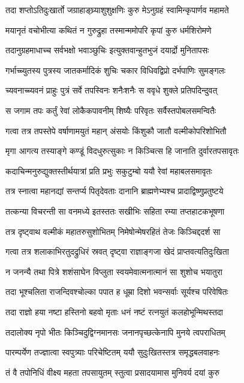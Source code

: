 \twolineshloka
{तदा शप्तोऽतिदुःखार्तो जग्राहाङ्घ्र्याशुशुक्षणिः}
{कुरु मेऽनुग्रहं स्वामिन्कृपार्णव महामते}%

\twolineshloka
{मयानृतं वचोभीत्या कथितं न गुरुद्रुहा}
{तस्मान्ममोपरि कृपां कुरु धर्मशिरोमणे}%

\twolineshloka
{तदानुग्रहमाधाच्च सर्वभक्षो भवाञ्छुचिः}
{इत्युक्तवान्हुतभुजं दयार्द्रो मुनितापसः}%

\twolineshloka
{गर्भाच्च्युतस्य पुत्रस्य जातकर्मादिकं शुचिः}
{चकार विधिवद्विप्रो दर्भपाणिः सुमङ्गलः}%

\twolineshloka
{च्यवनाच्च्यवनं प्राहुः पुत्रं सर्वे तपस्विनः}
{शनैःशनैः स ववृधे शुक्ले प्रतिपदिन्दुवत्}%

\twolineshloka
{स जगाम तपः कर्तुं रेवां लोकैकपावनीम्}
{शिष्यैः परिवृतः सर्वैस्तपोबलसमन्वितैः}%

\twolineshloka
{गत्वा तत्र तपस्तेपे वर्षाणामयुतं महान्}
{अंसयोः किंशुकौ जातौ वल्मीकोपरिशोभितौ}%

\twolineshloka
{मृगा आगत्य तस्याङ्गे कण्डूं विदधुरुत्सुकाः}
{न किञ्चित्स हि जानाति दुर्वारतपसावृतः}%

\twolineshloka
{कदाचिन्मनुरुद्युक्तस्तीर्थयात्रां प्रति प्रभुः}
{सकुटुम्बो ययौ रेवां महाबलसमावृतः}%

\twolineshloka
{तत्र स्नात्वा महानद्यां सन्तर्प्य पितृदेवताः}
{दानानि ब्राह्मणेभ्यश्च प्रादाद्विष्णुप्रतुष्टये}%

\twolineshloka
{तत्कन्या विचरन्ती सा वनमध्ये इतस्ततः}
{सखीभिः सहिता रम्या तप्तहाटकभूषणा}%

\twolineshloka
{तत्र दृष्ट्वाथ वल्मीकं महातरुसुशोभितम्}
{निमेषोन्मेषरहितं तेजः किञ्चिद्ददर्श सा}%

\twolineshloka
{गत्वा तत्र शलाकाभिरतुदद्रुधिरं स्रवत्}
{दृष्ट्वा राज्ञाङ्गजा खेदं प्राप्तवत्यतिदुःखिता}%

\twolineshloka
{न जनन्यै तथा पित्रे शशंसाघेन विप्लुता}
{स्वयमेवात्मनात्मानं सा शुशोच भयातुरा}%

\twolineshloka
{तदा भूश्चलिता राजन्दिवश्चोल्का पपात ह}
{धूम्रा दिशो भवन्सर्वाः सूर्यश्च परिवेषितः}%

\twolineshloka
{तदा राज्ञो हया नष्टा हस्तिनो बहवो मृताः}
{धनं नष्टं रत्नयुतं कलहोभून्मिथस्तदा}%

\twolineshloka
{तदालोक्य नृपो भीतः किञ्चिदुद्विग्नमानसः}
{जनानपृच्छत्केनापि मुनये त्वपराधितम्}%

\twolineshloka
{पारम्पर्येण तज्ज्ञात्वा स्वपुत्र्याः परिचेष्टितम्}
{ययौ सुदुःखितस्तत्र समृद्धबलवाहनः}%

\twolineshloka
{तं वै तपोनिधिं वीक्ष्य महता तपसायुतम्}
{स्तुत्वा प्रसादयामास मुनिवर्य दयां कुरु}%

